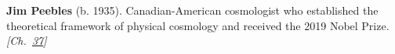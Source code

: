 \textbf{Jim Peebles} (b. 1935). Canadian-American cosmologist who established the theoretical framework of physical cosmology and received the 2019 Nobel Prize. \emph{[Ch.~\hyperref[ch:darkmatterevidence]{37}]}

